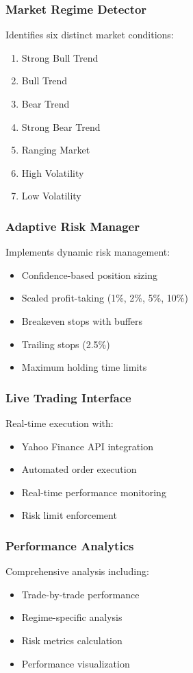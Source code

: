 \documentclass[11pt,a4paper]{article}
\begin{document}
\subsubsection{Market Regime Detector}
Identifies six distinct market conditions:
\begin{enumerate}
    \item Strong Bull Trend
    \item Bull Trend
    \item Bear Trend
    \item Strong Bear Trend
    \item Ranging Market
    \item High Volatility
    \item Low Volatility
\end{enumerate}

\subsubsection{Adaptive Risk Manager}
Implements dynamic risk management:
\begin{itemize}
    \item Confidence-based position sizing
    \item Scaled profit-taking (1\%, 2\%, 5\%, 10\%)
    \item Breakeven stops with buffers
    \item Trailing stops (2.5\%)
    \item Maximum holding time limits
\end{itemize}

\subsubsection{Live Trading Interface}
Real-time execution with:
\begin{itemize}
    \item Yahoo Finance API integration
    \item Automated order execution
    \item Real-time performance monitoring
    \item Risk limit enforcement
\end{itemize}

\subsubsection{Performance Analytics}
Comprehensive analysis including:
\begin{itemize}
    \item Trade-by-trade performance
    \item Regime-specific analysis
    \item Risk metrics calculation
    \item Performance visualization
\end{itemize}
\end{document}
